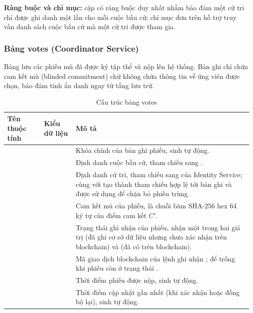 \textbf{Ràng buộc và chỉ mục:} cặp  có ràng buộc duy nhất nhằm bảo đảm một cử tri chỉ được ghi danh một lần cho mỗi cuộc bầu cử; chỉ mục đơn trên  hỗ trợ truy vấn danh sách cuộc bầu cử mà một cử tri được tham gia.

\subsubsection{Bảng votes (Coordinator Service)}

Bảng  lưu các phiếu mù đã được ký tập thể và nộp lên hệ thống. Bản ghi chỉ chứa cam kết mù (blinded commitment) chứ không chứa thông tin về ứng viên được chọn, bảo đảm tính ẩn danh ngay từ tầng lưu trữ.

\begin{table}[H]
    \centering
    \small
    \setlength{\tabcolsep}{3pt}
    \caption{Cấu trúc bảng votes}
    \label{tab:db-votes}
    \begin{tabularx}{\textwidth}{|L{0.25}|L{0.25}|L{0.50}|}
    \hline
    \textbf{Tên thuộc tính} & \textbf{Kiểu dữ liệu} & \textbf{Mô tả} \\
    \hline
                    &  & Khóa chính của bản ghi phiếu, sinh tự động. \\ \hline
            &  & Định danh cuộc bầu cử, tham chiếu sang . \\ \hline
               &  & Định danh cử tri, tham chiếu sang  của Identity Service; cùng với  tạo thành tham chiếu hợp lệ tới bản ghi  và được sử dụng để chặn bỏ phiếu trùng. \\ \hline
     &    & Cam kết mù của phiếu, là chuỗi băm SHA-256 hex 64 ký tự của điểm cam kết $C'$. \\ \hline
                &  & Trạng thái ghi nhận của phiếu, nhận một trong hai giá trị  (đã ghi cơ sở dữ liệu nhưng chưa xác nhận trên blockchain) và  (đã có trên blockchain). \\ \hline
         &   & Mã giao dịch blockchain của lệnh ghi nhận ; để trống khi phiếu còn ở trạng thái . \\ \hline
             &  & Thời điểm phiếu được nộp, sinh tự động. \\ \hline
             &  & Thời điểm cập nhật gần nhất (khi xác nhận hoặc đồng bộ lại), sinh tự động. \\ \hline
    \end{tabularx}
\end{table}

